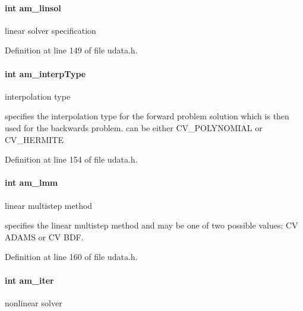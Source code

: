 \paragraph[{am\+\_\+linsol}]{\setlength{\rightskip}{0pt plus 5cm}int am\+\_\+linsol}\label{struct_user_data_a03fa52449ab4bb9a1a75312fd9064db1}
linear solver specification 

Definition at line 149 of file udata.\+h.

\hypertarget{struct_user_data_a02adc800558b1cdac3fa8bc96e65dbbb}{}
\paragraph[{am\+\_\+interp\+Type}]{\setlength{\rightskip}{0pt plus 5cm}int am\+\_\+interp\+Type}\label{struct_user_data_a02adc800558b1cdac3fa8bc96e65dbbb}
interpolation type

specifies the interpolation type for the forward problem solution which is then used for the backwards problem. can be either C\+V\+\_\+\+P\+O\+L\+Y\+N\+O\+M\+I\+A\+L or C\+V\+\_\+\+H\+E\+R\+M\+I\+T\+E 

Definition at line 154 of file udata.\+h.

\hypertarget{struct_user_data_a18b6fbc6159783acab9b5f4b106077cd}{}
\paragraph[{am\+\_\+lmm}]{\setlength{\rightskip}{0pt plus 5cm}int am\+\_\+lmm}\label{struct_user_data_a18b6fbc6159783acab9b5f4b106077cd}
linear multistep method

specifies the linear multistep method and may be one of two possible values\+: C\+V A\+D\+A\+M\+S or C\+V B\+D\+F. 

Definition at line 160 of file udata.\+h.

\hypertarget{struct_user_data_a2e0183eade68209e6835d3199054f0cc}{}
\paragraph[{am\+\_\+iter}]{\setlength{\rightskip}{0pt plus 5cm}int am\+\_\+iter}\label{struct_user_data_a2e0183eade68209e6835d3199054f0cc}
nonlinear solver

